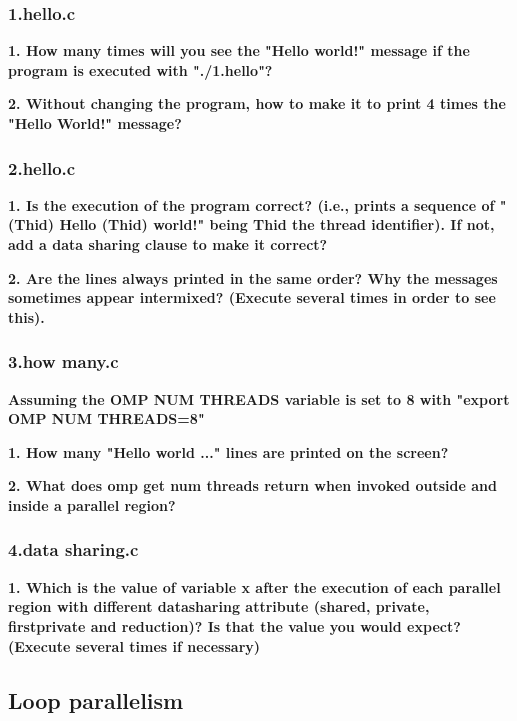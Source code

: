 \documentclass[12pt, a4paper]{article}
\begin{document}
\subsubsection{1.hello.c}

\textbf{1. How many times will you see the "Hello world!" message if the program is executed with
"./1.hello"?}

\hfill

\textbf{2. Without changing the program, how to make it to print 4 times the "Hello World!" message?}

\subsubsection{2.hello.c}

\textbf{1. Is the execution of the program correct? (i.e., prints a sequence of "(Thid) Hello (Thid)
world!" being Thid the thread identifier). If not, add a data sharing clause to make it correct?}

\hfill

\textbf{2. Are the lines always printed in the same order? Why the messages sometimes appear intermixed? (Execute several times in order to see this).}

\subsubsection{3.how many.c}

\textbf{Assuming the OMP NUM THREADS variable is set to 8 with "export OMP NUM THREADS=8"}

\hfill

\textbf{1. How many "Hello world ..." lines are printed on the screen?}

\hfill

\textbf{2. What does omp get num threads return when invoked outside and inside a parallel region?}

\subsubsection{4.data sharing.c}

\textbf{1. Which is the value of variable x after the execution of each parallel region with different datasharing attribute (shared, private, firstprivate and reduction)? Is that the value you
would expect? (Execute several times if necessary)}

\subsection{Loop parallelism}
\end{document}
